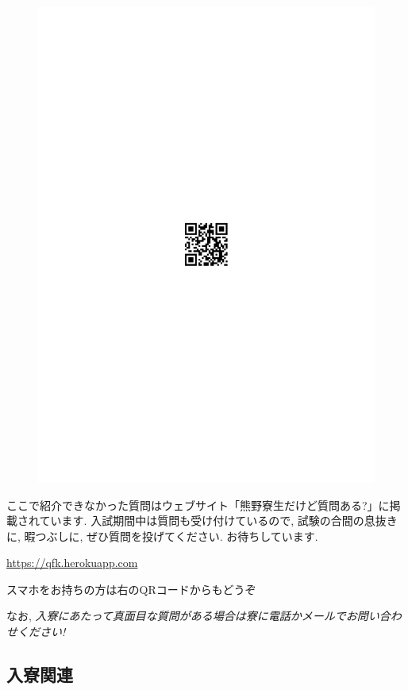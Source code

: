 \documentclass[10pt,b5jsbook,dvips,dvipdfmx,openany]{jsbook}
\theoremstyle{definition}
\begin{document}
\begin{figure}
 	 		\includegraphics[scale=0.8]{shitumon.pdf}
			\label{fig:UT}
			\end{figure}

ここで紹介できなかった質問はウェブサイト「熊野寮生だけど質問ある?」に掲載されています. 入試期間中は質問も受け付けているので, 試験の合間の息抜きに, 暇つぶしに, ぜひ質問を投げてください. お待ちしています.

\url{https://qfk.herokuapp.com}

スマホをお持ちの方は右のQRコードからもどうぞ

なお, \emph{入寮にあたって真面目な質問がある場合は寮に電話かメールでお問い合わせください!}

		\subsection{入寮関連}
\end{document}
